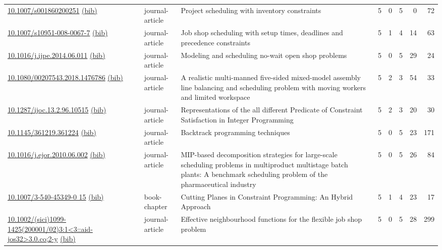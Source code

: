 {\begin{longtable}{p{5cm}lp{11cm}rrrrr}
\href{http://dx.doi.org/10.1007/s001860200251}{10.1007/s001860200251} \href{https://www.doi2bib.org/bib/10.1007/s001860200251}{(bib)} & journal-article & Project scheduling with inventory constraints & 5 & 0 & 5 & 0 & 72 \\
\href{http://dx.doi.org/10.1007/s10951-008-0067-7}{10.1007/s10951-008-0067-7} \href{https://www.doi2bib.org/bib/10.1007/s10951-008-0067-7}{(bib)} & journal-article & Job shop scheduling with setup times, deadlines and precedence constraints & 5 & 1 & 4 & 14 & 63 \\
\href{http://dx.doi.org/10.1016/j.ijpe.2014.06.011}{10.1016/j.ijpe.2014.06.011} \href{https://www.doi2bib.org/bib/10.1016/j.ijpe.2014.06.011}{(bib)} & journal-article & Modeling and scheduling no-wait open shop problems & 5 & 0 & 5 & 29 & 24 \\
\href{http://dx.doi.org/10.1080/00207543.2018.1476786}{10.1080/00207543.2018.1476786} \href{https://www.doi2bib.org/bib/10.1080/00207543.2018.1476786}{(bib)} & journal-article & A realistic multi-manned five-sided mixed-model assembly line balancing and scheduling problem with moving workers and limited workspace & 5 & 2 & 3 & 54 & 33 \\
\href{http://dx.doi.org/10.1287/ijoc.13.2.96.10515}{10.1287/ijoc.13.2.96.10515} \href{https://www.doi2bib.org/bib/10.1287/ijoc.13.2.96.10515}{(bib)} & journal-article & Representations of the all different Predicate of Constraint Satisfaction in Integer Programming & 5 & 2 & 3 & 20 & 30 \\
\href{http://dx.doi.org/10.1145/361219.361224}{10.1145/361219.361224} \href{https://www.doi2bib.org/bib/10.1145/361219.361224}{(bib)} & journal-article & Backtrack programming techniques & 5 & 0 & 5 & 23 & 171 \\
\href{http://dx.doi.org/10.1016/j.ejor.2010.06.002}{10.1016/j.ejor.2010.06.002} \href{https://www.doi2bib.org/bib/10.1016/j.ejor.2010.06.002}{(bib)} & journal-article & MIP-based decomposition strategies for large-scale scheduling problems in multiproduct multistage batch plants: A benchmark scheduling problem of the pharmaceutical industry & 5 & 0 & 5 & 26 & 84 \\
\href{http://dx.doi.org/10.1007/3-540-45349-0_15}{10.1007/3-540-45349-0 15} \href{https://www.doi2bib.org/bib/10.1007/3-540-45349-0_15}{(bib)} & book-chapter & Cutting Planes in Constraint Programming: An Hybrid Approach & 5 & 1 & 4 & 23 & 17 \\
\href{http://dx.doi.org/10.1002/(sici)1099-1425(200001/02)3:1<3::aid-jos32>3.0.co;2-y}{10.1002/(sici)1099-1425(200001/02)3:1<3::aid-jos32>3.0.co;2-y} \href{https://www.doi2bib.org/bib/10.1002/(sici)1099-1425(200001/02)3:1<3::aid-jos32>3.0.co;2-y}{(bib)} & journal-article & Effective neighbourhood functions for the flexible job shop problem & 5 & 0 & 5 & 28 & 299 \\

\end{longtable}}
